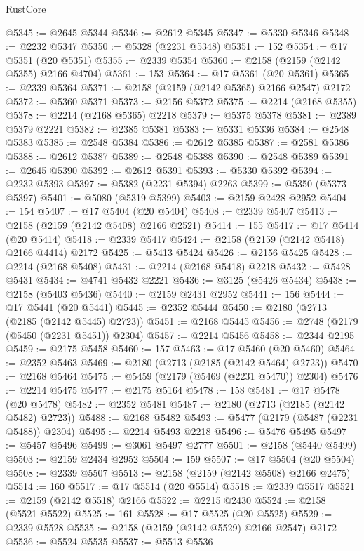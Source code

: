 \begin{lexlean}{RustCore}
\begin{coremodule}
@5345 := @2645 @5344
@5346 := @2612 @5345
@5347 := @5330 @5346
@5348 := @2232 @5347
@5350 := @5328 (@2231 @5348)
@5351 := 152
@5354 := @17 @5351 (@20 @5351)
@5355 := @2339 @5354
@5360 := @2158 (@2159 (@2142 @5355) @2166 @4704)
@5361 := 153
@5364 := @17 @5361 (@20 @5361)
@5365 := @2339 @5364
@5371 := @2158 (@2159 (@2142 @5365) @2166 @2547) @2172
@5372 := @5360 @5371
@5373 := @2156 @5372
@5375 := @2214 (@2168 @5355)
@5378 := @2214 (@2168 @5365) @2218
@5379 := @5375 @5378
@5381 := @2389 @5379 @2221
@5382 := @2385 @5381
@5383 := @5331 @5336
@5384 := @2548 @5383
@5385 := @2548 @5384
@5386 := @2612 @5385
@5387 := @2581 @5386
@5388 := @2612 @5387
@5389 := @2548 @5388
@5390 := @2548 @5389
@5391 := @2645 @5390
@5392 := @2612 @5391
@5393 := @5330 @5392
@5394 := @2232 @5393
@5397 := @5382 (@2231 @5394) @2263
@5399 := @5350 (@5373 @5397)
@5401 := @5080 (@5319 @5399)
@5403 := @2159 @2428 @2952
@5404 := 154
@5407 := @17 @5404 (@20 @5404)
@5408 := @2339 @5407
@5413 := @2158 (@2159 (@2142 @5408) @2166 @2521)
@5414 := 155
@5417 := @17 @5414 (@20 @5414)
@5418 := @2339 @5417
@5424 := @2158 (@2159 (@2142 @5418) @2166 @4414) @2172
@5425 := @5413 @5424
@5426 := @2156 @5425
@5428 := @2214 (@2168 @5408)
@5431 := @2214 (@2168 @5418) @2218
@5432 := @5428 @5431
@5434 := @4741 @5432 @2221
@5436 := @3125 (@5426 @5434)
@5438 := @2158 (@5403 @5436)
@5440 := @2159 @2431 @2952
@5441 := 156
@5444 := @17 @5441 (@20 @5441)
@5445 := @2352 @5444
@5450 := @2180 (@2713 (@2185 (@2142 @5445) @2723))
@5451 := @2168 @5445
@5456 := @2748 (@2179 (@5450 (@2231 @5451)) @2304)
@5457 := @2214 @5456
@5458 := @2344 @2195
@5459 := @2175 @5458
@5460 := 157
@5463 := @17 @5460 (@20 @5460)
@5464 := @2352 @5463
@5469 := @2180 (@2713 (@2185 (@2142 @5464) @2723))
@5470 := @2168 @5464
@5475 := @5459 (@2179 (@5469 (@2231 @5470)) @2304)
@5476 := @2214 @5475
@5477 := @2175 @5164
@5478 := 158
@5481 := @17 @5478 (@20 @5478)
@5482 := @2352 @5481
@5487 := @2180 (@2713 (@2185 (@2142 @5482) @2723))
@5488 := @2168 @5482
@5493 := @5477 (@2179 (@5487 (@2231 @5488)) @2304)
@5495 := @2214 @5493 @2218
@5496 := @5476 @5495
@5497 := @5457 @5496
@5499 := @3061 @5497 @2777
@5501 := @2158 (@5440 @5499)
@5503 := @2159 @2434 @2952
@5504 := 159
@5507 := @17 @5504 (@20 @5504)
@5508 := @2339 @5507
@5513 := @2158 (@2159 (@2142 @5508) @2166 @2475)
@5514 := 160
@5517 := @17 @5514 (@20 @5514)
@5518 := @2339 @5517
@5521 := @2159 (@2142 @5518) @2166
@5522 := @2215 @2430
@5524 := @2158 (@5521 @5522)
@5525 := 161
@5528 := @17 @5525 (@20 @5525)
@5529 := @2339 @5528
@5535 := @2158 (@2159 (@2142 @5529) @2166 @2547) @2172
@5536 := @5524 @5535
@5537 := @5513 @5536

\end{coremodule}
\end{lexlean}

